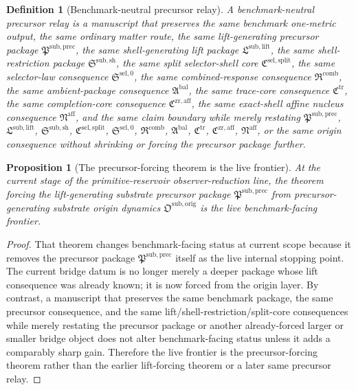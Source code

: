 \documentclass[11pt]{article}
\newcommand{\CompletionCore}{\mathfrak C^{\mathrm{zr,aff}}}
\newcommand{\TraceCore}{\mathfrak C^{\mathrm{tr}}}
\newcommand{\AffineNucleus}{\mathfrak N^{\mathrm{aff}}}
\newcommand{\AmbientPackage}{\mathfrak A^{\mathrm{bal}}}
\newcommand{\CombinedLaw}{\mathfrak R^{\mathrm{comb}}}
\newcommand{\SelectorLaw}{\mathfrak S^{\mathrm{sel},0}}
\newcommand{\SelectorCore}{\mathfrak C^{\mathrm{sel,split}}}
\newcommand{\ShellRestriction}{\mathfrak S^{\mathrm{sub,sh}}}
\newcommand{\LiftPackage}{\mathfrak L^{\mathrm{sub,lift}}}
\newcommand{\PrecursorPackage}{\mathfrak P^{\mathrm{sub,prec}}}
\newcommand{\OriginPackage}{\mathfrak O^{\mathrm{sub,orig}}}
\newtheorem{definition}{Definition}
\newtheorem{proposition}{Proposition}
\begin{document}
\begin{definition}[Benchmark-neutral precursor relay]
A \emph{benchmark-neutral precursor relay} is a manuscript that preserves the same benchmark one-metric output, the same ordinary matter route, the same lift-generating precursor package \(\PrecursorPackage\), the same shell-generating lift package \(\LiftPackage\), the same shell-restriction package \(\ShellRestriction\), the same split selector-shell core \(\SelectorCore\), the same selector-law consequence \(\SelectorLaw\), the same combined-response consequence \(\CombinedLaw\), the same ambient-package consequence \(\AmbientPackage\), the same trace-core consequence \(\TraceCore\), the same completion-core consequence \(\CompletionCore\), the same exact-shell affine nucleus consequence \(\AffineNucleus\), and the same claim boundary while merely restating \(\PrecursorPackage\), \(\LiftPackage\), \(\ShellRestriction\), \(\SelectorCore\), \(\SelectorLaw\), \(\CombinedLaw\), \(\AmbientPackage\), \(\TraceCore\), \(\CompletionCore\), \(\AffineNucleus\), or the same origin consequence without shrinking or forcing the precursor package further.
\end{definition}

\begin{proposition}[The precursor-forcing theorem is the live frontier]
At the current stage of the primitive-reservoir observer-reduction line, the theorem forcing the lift-generating substrate precursor package \(\PrecursorPackage\) from precursor-generating substrate origin dynamics \(\OriginPackage\) is the live benchmark-facing frontier.
\end{proposition}

\begin{proof}
That theorem changes benchmark-facing status at current scope because it removes the precursor package \(\PrecursorPackage\) itself as the live internal stopping point. The current bridge datum is no longer merely a deeper package whose lift consequence was already known; it is now forced from the origin layer. By contrast, a manuscript that preserves the same benchmark package, the same precursor consequence, and the same lift/shell-restriction/split-core consequences while merely restating the precursor package or another already-forced larger or smaller bridge object does not alter benchmark-facing status unless it adds a comparably sharp gain. Therefore the live frontier is the precursor-forcing theorem rather than the earlier lift-forcing theorem or a later same precursor relay.
\end{proof}
\end{document}
